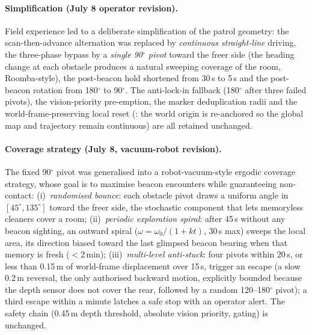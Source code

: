 \paragraph{Simplification (July 8 operator revision).} Field experience led
to a deliberate simplification of the patrol geometry: the scan-then-advance
alternation was replaced by \emph{continuous straight-line} driving, the
three-phase bypass by a \emph{single 90$^\circ$ pivot} toward the freer side
(the heading change at each obstacle produces a natural sweeping coverage of
the room, Roomba-style), the post-beacon hold shortened from 30\,s to 5\,s
and the post-beacon rotation from 180$^\circ$ to 90$^\circ$. The
anti-lock-in fallback (180$^\circ$ after three failed pivots), the
vision-priority pre-emption, the marker deduplication radii and the
world-frame-preserving local reset (: the world
origin is re-anchored so the global map and trajectory remain continuous) are
all retained unchanged.

\paragraph{Coverage strategy (July 8, vacuum-robot revision).} The fixed
90$^\circ$ pivot was generalised into a robot-vacuum-style ergodic coverage
strategy, whose goal is to maximise beacon encounters while guaranteeing
non-contact: (i)~\emph{randomised bounce}: each obstacle pivot draws a
uniform angle in $[45^\circ, 135^\circ]$ toward the freer side, the
stochastic component that lets memoryless cleaners cover a room;
(ii)~\emph{periodic exploration spiral}: after 45\,s without any beacon
sighting, an outward spiral ($\omega = \omega_0/(1+kt)$, 30\,s max)
sweeps the local area, its direction biased toward the last glimpsed beacon
bearing when that memory is fresh ($<$2\,min); (iii)~\emph{multi-level
anti-stuck}: four pivots within 20\,s, or less than 0.15\,m of
world-frame displacement over 15\,s, trigger an escape (a slow 0.2\,m
reversal, the only authorised backward motion, explicitly bounded because
the depth sensor does not cover the rear, followed by a random
120--180$^\circ$ pivot); a third escape within a minute latches a safe stop
with an operator alert. The safety chain (0.45\,m depth threshold, absolute
vision priority,  gating) is unchanged.

